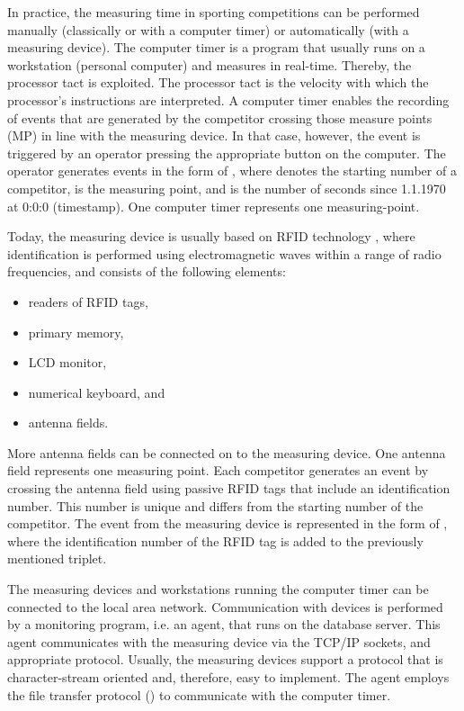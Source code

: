 \documentclass[preprint, prX]{revtex4}
\begin{document}
In practice, the measuring time in sporting competitions can be performed manually (classically or with a computer timer) or automatically (with a measuring device). The computer timer is a program that usually runs on a workstation (personal computer) and measures in real-time. Thereby, the processor tact is exploited. The processor tact is the velocity with which the processor's instructions are interpreted. A computer timer enables the recording of events that are generated by the competitor crossing those measure points (MP) in line with the measuring device. In that case, however, the event is triggered by an operator pressing the appropriate button on the computer. The operator generates events in the form of , where  denotes the starting number of a competitor,  is the measuring point, and  is the number of seconds since 1.1.1970 at 0:0:0 (timestamp). One computer timer represents one measuring-point.

Today, the measuring device is usually based on RFID technology \cite{Finkenzeller:2010}, where
identification is performed using electromagnetic waves within a range of radio frequencies, and consists of the following elements:
\begin{itemize}
  \item readers of RFID tags,
  \item primary memory,
  \item LCD monitor,
  \item numerical keyboard, and
  \item antenna fields.
\end{itemize}
More antenna fields can be connected on to the measuring device. One antenna field represents one measuring point. Each competitor
generates an event by crossing the antenna field using passive RFID tags that include an identification number. This number is unique and differs from the starting number of the competitor. The event from the measuring device is represented in the form of
, where the identification number of the RFID tag is added to the previously mentioned triplet.

The measuring devices and workstations running the computer timer can be connected to the local area network. Communication with devices is performed by a monitoring program, i.e. an agent, that runs on the database server. This agent communicates with the measuring device via the TCP/IP sockets, and appropriate protocol. Usually, the measuring devices support a  protocol that is character-stream
oriented and, therefore, easy to implement. The agent employs the file transfer protocol () to communicate with the computer timer.
\end{document}
